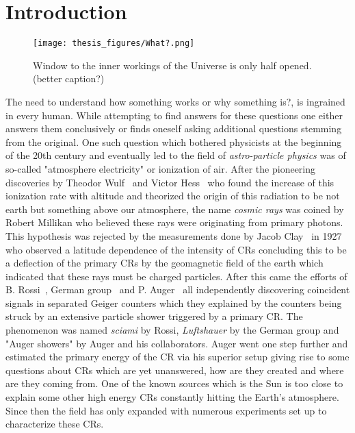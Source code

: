
\chapter{Introduction}
\label{sec:intro}
\begin{figure}[h!]
\centering
  \texttt{[image: thesis\_figures/What?.png]}
\caption{Window to the inner workings of the Universe is only half opened. (better caption?)}
\label{fig:intro}
\end{figure}
The need to understand how something works or why something is?, is ingrained in every human. While attempting to find answers for these questions one either answers them conclusively or finds oneself asking additional questions stemming from the original. One such question which bothered physicists at the beginning of the 20th century and eventually led to the field of \textit{astro-particle physics} was of so-called "atmosphere electricity" or ionization of air. After the pioneering discoveries by Theodor Wulf~\cite{article_Wulf} and Victor Hess~\cite{Hess:1912srp} who found the increase of this ionization rate with altitude and theorized the origin of this radiation to be not earth but something above our atmosphere, the name \textit{cosmic rays} was coined by Robert Millikan who believed these rays were originating from primary photons. This hypothesis was rejected by the measurements done by Jacob Clay~\cite{Clay:1927I,Clay:1928II} in 1927 who observed a latitude dependence of the intensity of \glspl{CR} concluding this to be a deflection of the primary \glspl{CR} by the geomagnetic field of the earth which indicated that these rays must be charged particles. After this came the efforts of B. Rossi~\cite{rossi1933eigenschaften}, German group~\cite{schmeiser1938harten} and P. Auger~\cite{RevModPhys.11.288} all independently discovering coincident signals in separated Geiger counters which they explained by the counters being struck by an extensive particle shower triggered by a primary \gls{CR}. The phenomenon was named \textit{sciami} by Rossi, \textit{Luftshauer} by the German group and "Auger showers" by Auger and his collaborators. Auger went one step further and estimated the primary energy of the \gls{CR} via his superior setup giving rise to some questions about \glspl{CR} which are yet unanswered, how are they created and where are they coming from. One of the known sources which is the Sun is too close to explain some other high energy \glspl{CR} constantly hitting the Earth's atmosphere. Since then the field has only expanded with numerous experiments set up to characterize these \glspl{CR}. 

